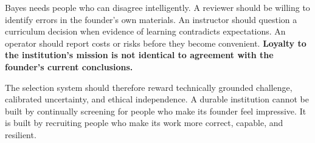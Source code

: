 Bayes needs people who can disagree intelligently. A reviewer should be willing to identify errors in the founder's own materials. An instructor should question a curriculum decision when evidence of learning contradicts expectations. An operator should report costs or risks before they become convenient. \textbf{Loyalty to the institution's mission is not identical to agreement with the founder's current conclusions.}

The selection system should therefore reward technically grounded challenge, calibrated uncertainty, and ethical independence. A durable institution cannot be built by continually screening for people who make its founder feel impressive. It is built by recruiting people who make its work more correct, capable, and resilient.
